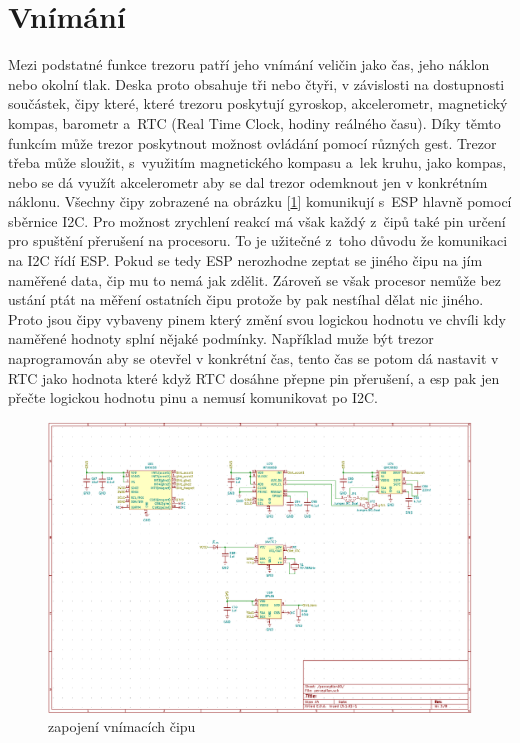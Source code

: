 \section*{Vnímání}

Mezi podstatné funkce trezoru patří jeho vnímání veličin jako čas, jeho náklon nebo okolní tlak.
Deska proto obsahuje tři nebo čtyři, v závislosti na dostupnosti součástek, čipy které, které trezoru poskytují gyroskop, akcelerometr, magnetický kompas,
barometr a~RTC (Real Time Clock, hodiny reálného času). Díky těmto funkcím může trezor poskytnout možnost ovládání pomocí různých gest. Trezor třeba může 
sloužit, s~využitím magnetického kompasu a~lek kruhu, jako kompas, nebo se dá využít akcelerometr aby se dal trezor odemknout jen v konkrétním náklonu.
Všechny čipy zobrazené na obrázku [\ref{fig:E4-sch_vnimani}] komunikují s~ESP hlavně pomocí sběrnice I2C. Pro možnost zrychlení reakcí má však každý 
z~čipů také pin určení pro spuštění přerušení na procesoru. To je užitečné z~toho důvodu že komunikaci na I2C řídí ESP. Pokud se tedy ESP nerozhodne 
zeptat se jiného čipu na jím naměřené data, čip mu to nemá jak zdělit. Zároveň se však procesor nemůže bez ustání ptát na měření ostatních čipu 
protože by pak nestíhal dělat nic jiného. Proto jsou čipy vybaveny pinem který změní svou logickou hodnotu ve chvíli kdy naměřené hodnoty splní nějaké 
podmínky. 
Například muže být trezor naprogramován aby se otevřel v konkrétní čas, tento čas se potom dá nastavit v RTC jako hodnota které když RTC 
dosáhne přepne pin přerušení, a esp pak jen přečte logickou hodnotu pinu a nemusí komunikovat po I2C. %

\begin{figure}[htbp]
    \centering
    \includegraphics[width=\textwidth]{kapitoly/obrazky/E4/vnimani/sch.png}
    \caption{zapojení vnímacích čipu}
    \label{fig:E4-sch_vnimani}
\end{figure}

